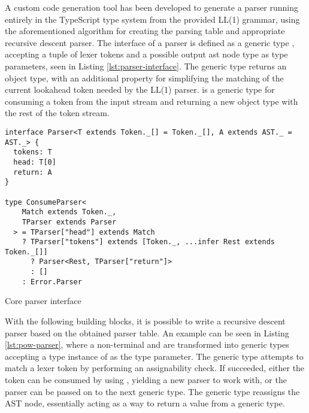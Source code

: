 A custom code generation tool has been developed to generate a parser running entirely in the TypeScript type system from the provided LL(1) grammar, using the aforementioned algorithm for creating the parsing table and appropriate recursive descent parser. The interface of a parser is defined as a generic type , accepting a tuple of lexer tokens and a possible output \acrshort{ast} node type as type parameters, seen in Listing \ref{lst:parser-interface}. The generic type returns an object type, with an additional  property for simplifying the matching of the current lookahead token needed by the LL(1) parser.  is a generic type for consuming a token from the input stream and returning a new object type with the rest of the token stream.

\begin{listing}[ht]
  \begin{verbatim}
interface Parser<T extends Token._[] = Token._[], A extends AST._ = AST._> {
  tokens: T
  head: T[0]
  return: A
}

type ConsumeParser<
    Match extends Token._,
    TParser extends Parser
  > = TParser["head"] extends Match
    ? TParser["tokens"] extends [Token._, ...infer Rest extends Token._[]]
      ? Parser<Rest, TParser["return"]>
      : []
    : Error.Parser
\end{verbatim}
  \caption{Core parser interface}\label{lst:parser-interface}
\end{listing}

With the following building blocks, it is possible to write a recursive descent parser based on the obtained parser table. An example can be seen in Listing \ref{lst:pow-parser}, where a non-terminal  and  are transformed into generic types accepting a type instance of  as the type parameter. The generic type attempts to match a lexer token by performing an assignability check. If succeeded, either the token can be consumed by using , yielding a new parser to work with, or the parser can be passed on to the next generic type. The  generic type reassigns the AST node, essentially acting as a way to return a value from a generic type.


